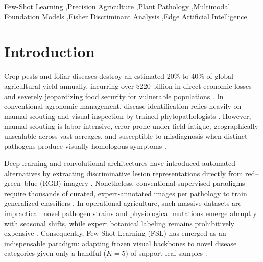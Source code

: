 \documentclass[preprint,12pt]{elsarticle}
\begin{document}
\begin{frontmatter}
\begin{keyword}
Few-Shot Learning \sep Precision Agriculture \sep Plant Pathology \sep Multimodal Foundation Models \sep Fisher Discriminant Analysis \sep Edge Artificial Intelligence
\end{keyword}

\end{frontmatter}

\section{Introduction}
\label{sec:introduction}
Crop pests and foliar diseases destroy an estimated 20\% to 40\% of global agricultural yield annually, incurring over \$220 billion in direct economic losses and severely jeopardizing food security for vulnerable populations \cite{richard2022control}. In conventional agronomic management, disease identification relies heavily on manual scouting and visual inspection by trained phytopathologists \cite{khakimov2022traditional, shoaib2023advanced}. However, manual scouting is labor-intensive, error-prone under field fatigue, geographically unscalable across vast acreages, and susceptible to misdiagnosis when distinct pathogens produce visually homologous symptoms \cite{shoaib2023advanced}.

Deep learning and convolutional architectures have introduced automated alternatives by extracting discriminative lesion representations directly from red--green--blue (RGB) imagery \cite{shoaib2023advanced}. Nonetheless, conventional supervised paradigms require thousands of curated, expert-annotated images per pathology to train generalized classifiers \cite{shafik2023systematic}. In operational agriculture, such massive datasets are impractical: novel pathogen strains and physiological mutations emerge abruptly with seasonal shifts, while expert botanical labeling remains prohibitively expensive \cite{sun2024few}. Consequently, Few-Shot Learning (FSL) has emerged as an indispensable paradigm: adapting frozen visual backbones to novel disease categories given only a handful ($K=5$) of support leaf samples \cite{snell2017prototypical, sun2024few}.
\end{document}
